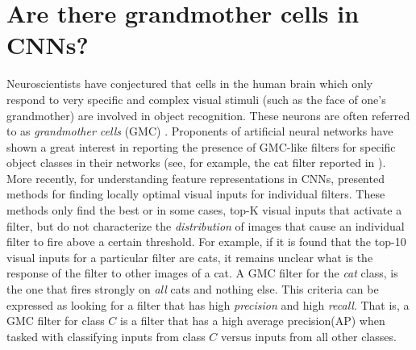 \section{Are there grandmother cells in CNNs?}
\label{sec:grand-mother}
Neuroscientists have conjectured that cells in the human brain which only respond to very specific and complex visual stimuli (such as the face of one's grandmother) are involved in object recognition.
These neurons are often referred to as \emph{grandmother cells} (GMC) \cite{Barlow,Grandmother}. Proponents of artificial neural networks have shown a great interest in reporting the presence of GMC-like filters for specific object classes in their networks (see, for example, the cat filter reported in \cite{GoogleCat}). More recently, for understanding feature representations in CNNs, \cite{Simonyan,DeConv} presented methods for finding locally optimal visual inputs for individual filters.
These methods only find the best or in some cases, top-K visual inputs that activate a filter, but do not characterize the \emph{distribution} of images that cause an individual filter to fire above a certain threshold. For example, if it is found that the top-10 visual inputs for a particular filter are cats, it remains unclear what is the response of the filter to other images of a cat.
A GMC filter for the \emph{cat} class, is the one that fires strongly on \emph{all} cats and nothing else.
This criteria can be expressed as looking for a filter that has high \emph{precision} and high \emph{recall}.
That is, a GMC filter for class $C$ is a filter that has a high average precision(AP) when tasked with classifying inputs from class $C$ versus inputs from all other classes.

 

